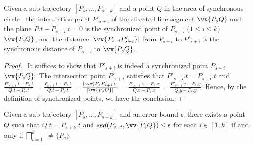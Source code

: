




\begin{prop}
\label{prop-3d-syn-point}
Given a sub-trajectory $[P_s, \ldots, P_{s+k}]$ and a point $Q$ in the area of synchronous circle , the intersection point $P'_{s+i}$ of the directed line segment $\vv{P_sQ}$ and the plane $P.t - P_{s+i}.t = 0$ is the synchronized point of $P_{s+i}$ ($1\le i\le k$) \wrt  $\vv{P_sQ}$, and the distance $|\vv{P_{s+i}P'_{s+i}}|$ from $P_{s+i}$ to $P'_{s+i}$ is the synchronous distance of $P_{s+i}$ to $\vv{P_sQ}$.
\end{prop}

\begin{proof}\ It suffices to show that $P'_{s+i}$ is indeed a synchronized point $P_{s+i}$ \wrt $\vv{P_sQ}$.
%
The intersection point $P'_{s+i}$ satisfies that $P'_{s+i}.t = P_{s+i}.t$ and
$\frac{P'_{s+i}.t - P_{s}.t}{Q.t - P_{s}.t}$ = $\frac{P_{s+i}.t - P_{s}.t}{Q.t - P_{s}.t}$  =
$\frac{|\vv{P_sP'_{s+i}}|}{|\vv{P_sQ}|}$ =
$\frac{P'_{s+i}.x - P_{s}.x}{Q.x - P_{s}.x}$ = $\frac{P'_{s+i}.y - P_{s}.y}{Q.y - P_{s}.y}$.
%
Hence, by the definition of synchronized points, we have the conclusion. \eop
\end{proof}






\begin{prop}
\label{prop-3d-ci}
Given a sub-trajectory $[P_s,...,P_{s+k}]$ and an error bound $\epsilon$, there exists a point $Q$ such that $Q.t = P_{s+k}.t$ and $sed(P_{s+i}, \vv{P_sQ})\le \epsilon$ for each $i \in [1,k]$ if and only if $\bigsqcap_{i=1}^{k}$ $\ne \{P_s\}$.
\end{prop}

